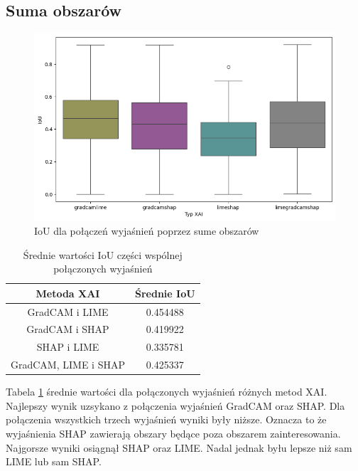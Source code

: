 \subsection*{Suma obszarów}
\begin{figure}[h]
	\centering\includegraphics[width=.9\textwidth]{img/combine_iou_or}
	\caption{IoU dla połączeń wyjaśnień poprzez sume obszarów}  \label{rys:combine_iou_or}
\end{figure}
\begin{table}[h]
	\centering
	\begin{tabular}{|c|c|}
		\hline
		\textbf{Metoda XAI}  & Średnie IoU \\
		\hline
		GradCAM i LIME       & 0.454488    \\
		\hline
		GradCAM i SHAP       & 0.419922    \\
		\hline
		SHAP i LIME          & 0.335781    \\
		\hline
		GradCAM, LIME i SHAP & 0.425337    \\
		\hline
	\end{tabular}
	\caption{Średnie wartości IoU części wspólnej połączonych wyjaśnień}
	\label{tab:combineandiou}
\end{table}
Tabela \ref{tab:combineandiou} średnie wartości dla połączonych wyjaśnień różnych metod XAI.
Najlepszy wynik uzsykano z połączenia wyjaśnień GradCAM oraz SHAP.
Dla połączenia wszystkich trzech wyjaśnień wyniki były niższe.
Oznacza to że wyjaśnienia SHAP zawierają obszary będące poza obszarem zainteresowania.
Najgorsze wyniki osiągnął SHAP oraz LIME.
Nadal jednak byłu lepsze niż sam LIME lub sam SHAP.

